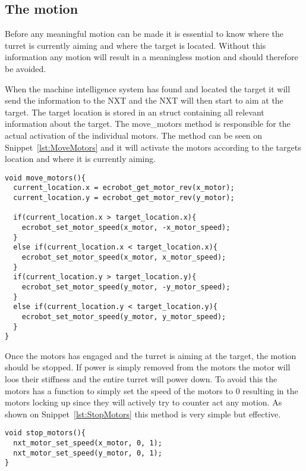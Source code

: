 \subsection{The motion}
Before any meaningful motion can be made it is essential to know where the turret is currently aiming and where the target is located. 
Without this information any motion will result in a meaningless motion and should therefore be avoided. 

When the machine intelligence system has found and located the target it will send the information to the NXT and the NXT will then start to aim at the target. 
The target location is stored in an struct containing all relevant information about the target. 
The move\_motors method is responsible for the actual activation of the individual motors.
The method can be seen on Snippet~\ref{lst:MoveMotors} and it will activate the motors according to the targets location and where it is currently aiming. 
\begin{lstlisting}[language=CSharp,caption={move\_motors method from movement.c},label={lst:MoveMotors}]
void move_motors(){
  current_location.x = ecrobot_get_motor_rev(x_motor);
  current_location.y = ecrobot_get_motor_rev(y_motor);

  if(current_location.x > target_location.x){
    ecrobot_set_motor_speed(x_motor, -x_motor_speed);
  }
  else if(current_location.x < target_location.x){
    ecrobot_set_motor_speed(x_motor, x_motor_speed);
  }
  if(current_location.y > target_location.y){
    ecrobot_set_motor_speed(y_motor, -y_motor_speed);
  }
  else if(current_location.y < target_location.y){
    ecrobot_set_motor_speed(y_motor, y_motor_speed);
  }
}
\end{lstlisting}
Once the motors has engaged and the turret is aiming at the target, the motion should be stopped. 
If power is simply removed from the motors the motor will loos their stiffness and the entire turret will power down. 
To avoid this the motors has a function to simply set the speed of the motors to $0$ resulting in the motors locking up since they will actively try to counter act any motion. 
As shown on Snippet~\ref{lst:StopMotors} this method is very simple but effective. 
\begin{lstlisting}[language=CSharp,label={lst:StopMotors},caption={stop\_motors method from movement.c}]
void stop_motors(){
  nxt_motor_set_speed(x_motor, 0, 1);
  nxt_motor_set_speed(y_motor, 0, 1);
}
\end{lstlisting}

